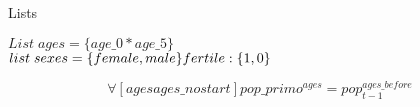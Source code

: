 \documentclass{article}
\begin{document}
{\setlength{\parskip}{1em}
 \setlength{\parindent}{0pt}
  
Lists 

$List \; ages =  \{age\_0 * age\_5\}$  \\
$list \; sexes  =  \{female , male \} \\ 
               fertile : \{    1 ,    0 \}$  

\begin{equation}
\label{eq:SHARES3}
\forall [ages ages\_nostart]  pop\_primo^{ages} = pop^{ages\_before}_{t-1} 
\end{equation}
   }
\end{document}
